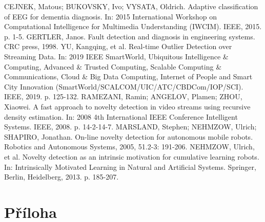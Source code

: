 \documentclass[11pt,twoside,openright]{report}
\begin{document}
\begin{thebibliography}{L}
CEJNEK, Matous; BUKOVSKY, Ivo; VYSATA, Oldrich. Adaptive classification of EEG for dementia diagnosis. In: 2015 International Workshop on Computational Intelligence for Multimedia Understanding (IWCIM). IEEE, 2015. p. 1-5.
GERTLER, Janos. Fault detection and diagnosis in engineering systems. CRC press, 1998.
YU, Kangqing, et al. Real-time Outlier Detection over Streaming Data. In: 2019 IEEE SmartWorld, Ubiquitous Intelligence \& Computing, Advanced \& Trusted Computing, Scalable Computing \& Communications, Cloud \& Big Data Computing, Internet of People and Smart City Innovation (SmartWorld/SCALCOM/UIC/ATC/CBDCom/IOP/SCI). IEEE, 2019. p. 125-132.
RAMEZANI, Ramin; ANGELOV, Plamen; ZHOU, Xiaowei. A fast approach to novelty detection in video streams using recursive density estimation. In: 2008 4th International IEEE Conference Intelligent Systems. IEEE, 2008. p. 14-2-14-7.
MARSLAND, Stephen; NEHMZOW, Ulrich; SHAPIRO, Jonathan. On-line novelty detection for autonomous mobile robots. Robotics and Autonomous Systems, 2005, 51.2-3: 191-206.
NEHMZOW, Ulrich, et al. Novelty detection as an intrinsic motivation for cumulative learning robots. In: Intrinsically Motivated Learning in Natural and Artificial Systems. Springer, Berlin, Heidelberg, 2013. p. 185-207.

\end{thebibliography}



\clearpage
\chapter*{Příloha}
\begin{appendices}

\end{appendices}
\end{document}
